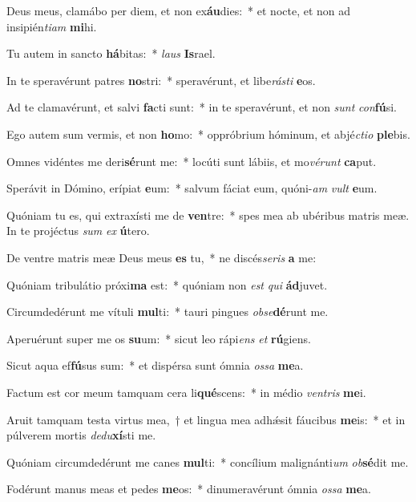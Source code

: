 \item Deus meus, clamábo per diem, et non ex\textbf{áu}dies:~* et nocte, et non ad insipién\textit{tiam} \textbf{mi}hi.
\item Tu autem in sancto \textbf{há}bitas:~* \textit{laus} \textbf{Is}rael.
\item In te speravérunt patres \textbf{no}stri:~* speravérunt, et libe\textit{rásti} \textbf{e}os.
\item Ad te clamavérunt, et salvi \textbf{fa}cti sunt:~* in te speravérunt, et non \textit{sunt} \textit{con}\textbf{fú}si.
\item Ego autem sum vermis, et non \textbf{ho}mo:~* oppróbrium hóminum, et abjé\hspace{0.02em}\textit{ctio} \textbf{ple}bis.
\item Omnes vidéntes me deri\textbf{sé}runt me:~* locúti sunt lábiis, et mo\textit{vérunt} \textbf{ca}put.
\item Sperávit in Dómino, erípiat \textbf{e}um:~* salvum fáciat eum, quóni-\hspace{0.03em}\textit{am} \textit{vult} \textbf{e}um.
\item Quóniam tu es, qui extraxísti me de \textbf{ven}tre:~* spes mea ab ubéribus matris meæ. In te projéctus \textit{sum} \textit{ex} \textbf{ú}tero.
\item De ventre matris meæ Deus meus \textbf{es} tu,~* ne discés\hspace{0.03em}\textit{seris} \textbf{a} me:
\item Quóniam tribulátio próxi\textbf{ma} est:~* quóniam non \textit{est} \textit{qui} \textbf{ád}juvet.
\item Circumdedérunt me vítuli \textbf{mul}ti:~* tauri pingues \textit{obse}\textbf{dé}runt me.
\item Aperuérunt super me os \textbf{su}um:~* sicut leo rápi\textit{ens} \textit{et} \textbf{rú}giens.
\item Sicut aqua ef\textbf{fú}sus sum:~* et dispérsa sunt ómnia \textit{ossa} \textbf{me}a.
\item Factum est cor meum tamquam cera li\textbf{qué}scens:~* in médio \textit{ventris} \textbf{me}i.
\item Aruit tamquam testa virtus mea,~† et lingua mea adhǽsit fáucibus \textbf{me}is:~* et in púlverem mortis \textit{dedu}\textbf{xí}sti me.
\item Quóniam circumdedérunt me canes \textbf{mul}ti:~* concílium malignánti\textit{um} \textit{ob}\textbf{sé}dit me.
\item Fodérunt manus meas et pedes \textbf{me}os:~* dinumeravérunt ómnia \textit{ossa} \textbf{me}a.
